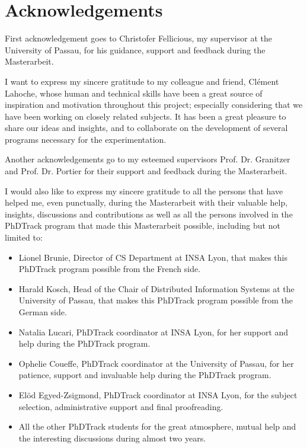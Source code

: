 \documentclass[11pt]{book} %
\begin{document}
\newpage
\section*{Acknowledgements}
First acknowledgement goes to Christofer Fellicious, my supervisor at the University of Passau, for his guidance, support and feedback during the Masterarbeit. 

I want to express my sincere gratitude to my colleague and friend, Clément Lahoche, whose human and technical skills have been a great source of inspiration and motivation throughout this project;  especially considering that we have been working on closely related subjects. It has been a great pleasure to share our ideas and insights, and to collaborate on the development of several programs necessary for the experimentation. 

Another acknowledgements go to my esteemed supervisors Prof. Dr. Granitzer and Prof. Dr. Portier for their support and feedback during the Masterarbeit. 

I would also like to express my sincere gratitude to all the persons that have helped me, even punctually, during the Masterarbeit with their valuable help, insights, discussions and contributions as well as all the persons involved in the PhDTrack program that made this Masterarbeit possible, including but not limited to: 
\begin{itemize}
    \item Lionel Brunie, Director of CS Department at INSA Lyon, that makes this PhDTrack program possible from the French side.
    \item Harald Kosch, Head of the Chair of Distributed Information Systems at the University of Passau, that makes this PhDTrack program possible from the German side.
    \item Natalia Lucari, PhDTrack coordinator at INSA Lyon, for her support and help during the PhDTrack program.
    \item Ophelie Coueffe, PhDTrack coordinator at the University of Passau, for her patience, support and invaluable help during the PhDTrack program.
    \item Elöd Egyed-Zsigmond, PhDTrack coordinator at INSA Lyon, for the subject selection, administrative support and final proofreading.
    \item All the other PhDTrack students for the great atmosphere, mutual help and the interesting discussions during almost two years.
\end{itemize}
\end{document}
